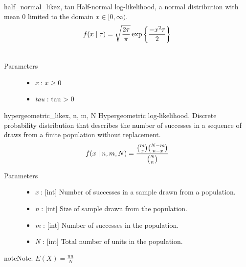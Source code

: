 \hypertarget{pymc.distributions.half_normal_like}{}\begin{funcdesc}{half\_normal\_like}{x, tau}
Half-normal log-likelihood, a normal distribution with mean 0 limited
to the domain $x \in [0, \infty)$.
\begin{gather}
\begin{split}f(x \mid \tau) = \sqrt{\frac{2\tau}{\pi}}\exp\left\{ {\frac{-x^2 \tau}{2}}\right\}\end{split}\notag\\\begin{split}\end{split}\notag
\end{gather}\begin{description}
\item[Parameters] \leavevmode\begin{itemize}
\item {} 
\emph{x} : $x \ge 0$

\item {} 
\emph{tau} : tau \textgreater{} 0

\end{itemize}

\end{description}
\end{funcdesc}

\begin{funcdesc}{hypergeometric\_like}{x, n, m, N}
Hypergeometric log-likelihood. Discrete probability distribution that
describes the number of successes in a sequence of draws from a finite
population without replacement.
\begin{gather}
\begin{split}f(x \mid n, m, N) = \frac{\binom{m}{x}\binom{N-m}{n-x}}{\binom{N}{n}}\end{split}\notag
\end{gather}\begin{description}
\item[Parameters] \leavevmode\begin{itemize}
\item {} 
\emph{x} : {[}int{]} Number of successes in a sample drawn from a population.

\item {} 
\emph{n} : {[}int{]} Size of sample drawn from the population.

\item {} 
\emph{m} : {[}int{]} Number of successes in the population.

\item {} 
\emph{N} : {[}int{]} Total number of units in the population.

\end{itemize}

\end{description}

\begin{notice}{note}{Note:}
$E(X) = \frac{n n}{N}$
\end{notice}
\end{funcdesc}

